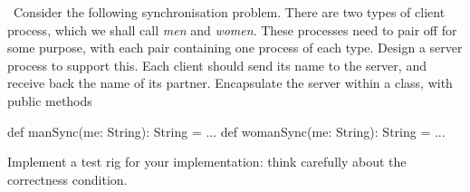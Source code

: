 \begin{question}
\Programming\ Consider the following synchronisation problem.  There are two
types of client process, which we shall call \emph{men} and \emph{women}.
These processes need to pair off for some purpose, with each pair containing
one process of each type.
%
Design a server process to support this.  Each client should send its name to
the server, and receive back the name of its partner.  Encapsulate the server
within a class, with public methods
\begin{scala}
  def manSync(me: String): String = ...
  def womanSync(me: String): String = ...
\end{scala}

Implement a test rig for your implementation: think carefully about the
correctness condition. 
\end{question}


